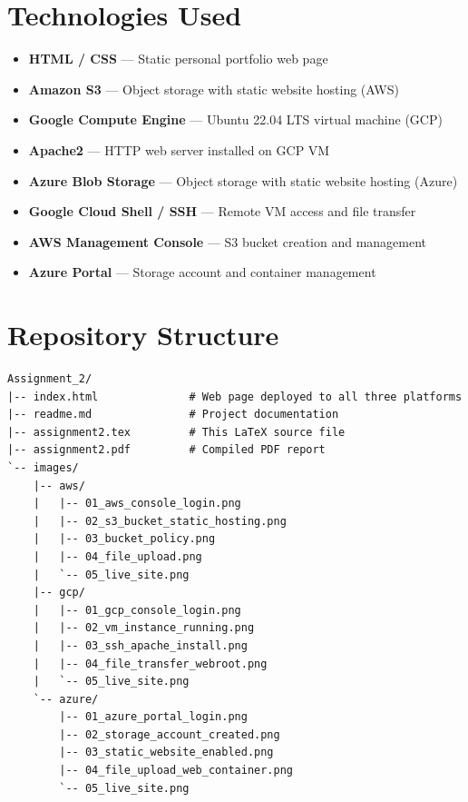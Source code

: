 \documentclass[12pt,letterpaper]{article}
\begin{document}
\section{Technologies Used}

\begin{itemize}
  \item \textbf{HTML / CSS} --- Static personal portfolio web page
  \item \textbf{Amazon S3} --- Object storage with static website hosting (AWS)
  \item \textbf{Google Compute Engine} --- Ubuntu 22.04 LTS virtual machine (GCP)
  \item \textbf{Apache2} --- HTTP web server installed on GCP VM
  \item \textbf{Azure Blob Storage} --- Object storage with static website hosting (Azure)
  \item \textbf{Google Cloud Shell / SSH} --- Remote VM access and file transfer
  \item \textbf{AWS Management Console} --- S3 bucket creation and management
  \item \textbf{Azure Portal} --- Storage account and container management
\end{itemize}

\section{Repository Structure}

\begin{lstlisting}[style=bashStyle, frame=none, backgroundcolor=\color{white}]
Assignment_2/
|-- index.html              # Web page deployed to all three platforms
|-- readme.md               # Project documentation
|-- assignment2.tex         # This LaTeX source file
|-- assignment2.pdf         # Compiled PDF report
`-- images/
    |-- aws/
    |   |-- 01_aws_console_login.png
    |   |-- 02_s3_bucket_static_hosting.png
    |   |-- 03_bucket_policy.png
    |   |-- 04_file_upload.png
    |   `-- 05_live_site.png
    |-- gcp/
    |   |-- 01_gcp_console_login.png
    |   |-- 02_vm_instance_running.png
    |   |-- 03_ssh_apache_install.png
    |   |-- 04_file_transfer_webroot.png
    |   `-- 05_live_site.png
    `-- azure/
        |-- 01_azure_portal_login.png
        |-- 02_storage_account_created.png
        |-- 03_static_website_enabled.png
        |-- 04_file_upload_web_container.png
        `-- 05_live_site.png
\end{lstlisting}
\end{document}
